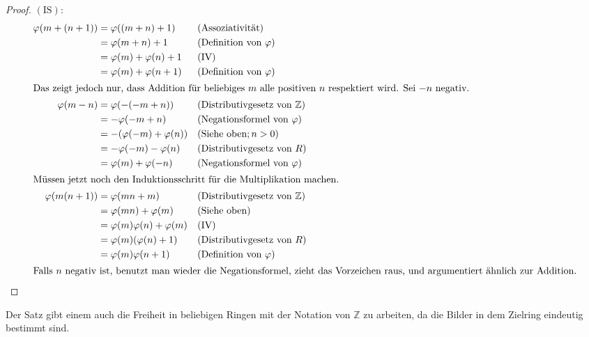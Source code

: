 \documentclass{article}
\theoremstyle{definition}
\theoremstyle{remark}
\begin{document}
\begin{proof}
\vspace{0.25em}
\flushleft$(\text{IS})$:\vspace{-1.8em}
\begin{align*}
    \varphi(m+(n+1)) &= \varphi((m+n)+1)    &&(\text{Assoziativität}) \\
                     &= \varphi(m+n)+1      &&(\text{Definition von }\varphi) \\
                     &= \varphi(m)+\varphi(n)+1 &&(\text{IV}) \\
                     &= \varphi(m)+\varphi(n+1) &&(\text{Definition von }\varphi) \\
\intertext{Das zeigt jedoch nur, dass Addition für beliebiges $m$ alle positiven $n$ respektiert wird. Sei
$-n$ negativ.}
    \varphi(m-n)     &= \varphi(-(-m+n))    &&(\text{Distributivgesetz von }\mathbb Z) \\
                     &= -\varphi(-m+n)      &&(\text{Negationsformel von }\varphi) \\
                     &= -(\varphi(-m)+\varphi(n)) &&(\text{Siehe oben}; n>0) \\
                     &= -\varphi(-m)-\varphi(n) &&(\text{Distributivgesetz von }R) \\
                     &= \varphi(m)+\varphi(-n)  &&(\text{Negationsformel von }\varphi) \\
\intertext{Müssen jetzt noch den Induktionsschritt für die Multiplikation machen.}
    \varphi(m(n+1))  &= \varphi(mn+m)       &&(\text{Distributivgesetz von }\mathbb Z) \\
                     &= \varphi(mn)+\varphi(m) &&(\text{Siehe oben}) \\
                     &= \varphi(m)\varphi(n)+\varphi(m) &&(\text{IV}) \\
                     &= \varphi(m)(\varphi(n)+1) &&(\text{Distributivgesetz von }R) \\
                     &= \varphi(m)\varphi(n+1) &&(\text{Definition von }\varphi) \\
\intertext{Falls $n$ negativ ist, benutzt man wieder die Negationsformel, zieht das Vorzeichen raus, und
argumentiert ähnlich zur Addition.}
\end{align*}
\end{proof}

Der Satz gibt einem auch die Freiheit in beliebigen Ringen mit der Notation von $\mathbb Z$ zu arbeiten, da die
Bilder in dem Zielring eindeutig bestimmt sind.
\end{document}
